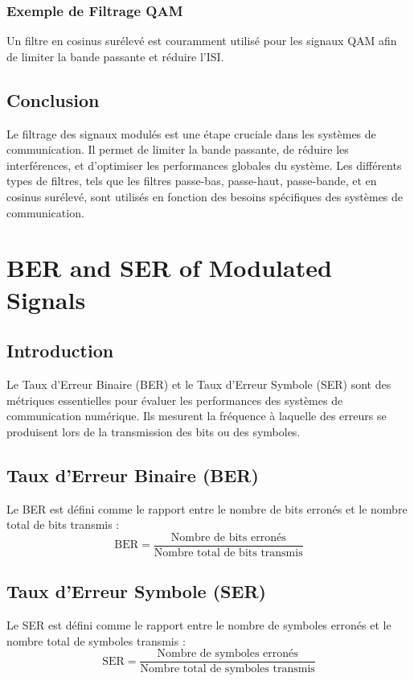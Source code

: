 \documentclass[10pt,a4paper]{article}
\begin{document}
\subsubsection*{Exemple de Filtrage QAM}
Un filtre en cosinus surélevé est couramment utilisé pour les signaux QAM afin de limiter la bande passante et réduire l'ISI.

\subsection*{Conclusion}
Le filtrage des signaux modulés est une étape cruciale dans les systèmes de communication. Il permet de limiter la bande passante, de réduire les interférences, et d'optimiser les performances globales du système. Les différents types de filtres, tels que les filtres passe-bas, passe-haut, passe-bande, et en cosinus surélevé, sont utilisés en fonction des besoins spécifiques des systèmes de communication.

\section*{BER and SER of Modulated Signals}

\subsection*{Introduction}
Le Taux d'Erreur Binaire (BER) et le Taux d'Erreur Symbole (SER) sont des métriques essentielles pour évaluer les performances des systèmes de communication numérique. Ils mesurent la fréquence à laquelle des erreurs se produisent lors de la transmission des bits ou des symboles.

\subsection*{Taux d'Erreur Binaire (BER)}
Le BER est défini comme le rapport entre le nombre de bits erronés et le nombre total de bits transmis :
\[ \text{BER} = \frac{\text{Nombre de bits erronés}}{\text{Nombre total de bits transmis}} \]

\subsection*{Taux d'Erreur Symbole (SER)}
Le SER est défini comme le rapport entre le nombre de symboles erronés et le nombre total de symboles transmis :
\[ \text{SER} = \frac{\text{Nombre de symboles erronés}}{\text{Nombre total de symboles transmis}} \]
\end{document}
